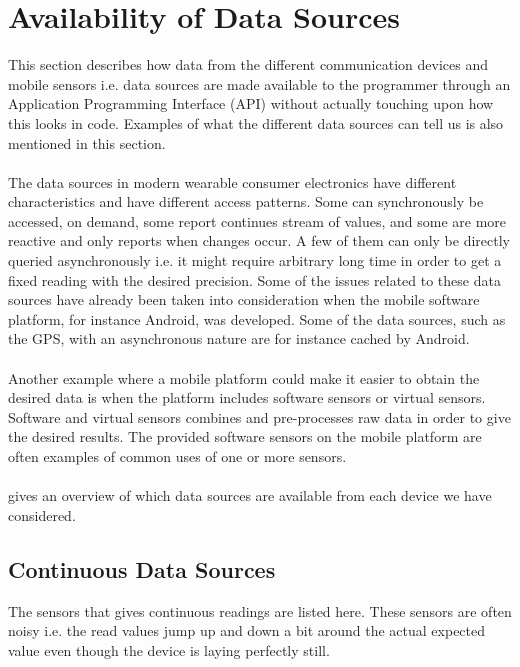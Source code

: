 
\section{Availability of Data Sources}
\label{sec:availability_of_data_sources}

This section describes how data from the different communication devices and mobile sensors i.e. data sources are made available to the programmer through an Application Programming Interface (API) without actually touching upon how this looks in code. Examples of what the different data sources can tell us is also mentioned in this section. 
\\\\
The data sources in modern wearable consumer electronics have different characteristics and have different access patterns. Some can synchronously be accessed, on demand, some report continues stream of values, and some are more reactive and only reports when changes occur. A few of them can only be directly queried asynchronously i.e. it might require arbitrary long time in order to get a fixed reading with the desired precision. Some of the issues related to these data sources have already been taken into consideration when the mobile software platform, for instance Android, was developed. Some of the data sources, such as the GPS, with an asynchronous nature are for instance cached by Android. 
\\\\
Another example where a mobile platform could make it easier to obtain the desired data is when the platform includes software sensors or virtual sensors. Software and virtual sensors combines and pre-processes raw data in order to give the desired results. The provided software sensors on the mobile platform are often examples of common uses of one or more sensors. 
\\\\
 gives an overview of which data sources are available from each device we have considered.
\\


\subsection{Continuous Data Sources}
\label{sub:continuous_sensors}
The sensors that gives continuous readings are listed here. These sensors are often noisy i.e. the read values jump up and down a bit around the actual expected value even though the device is laying perfectly still.

